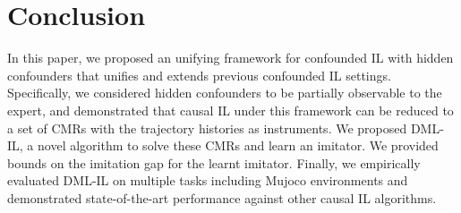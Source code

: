 \section{Conclusion}
In this paper, we proposed an unifying framework for confounded IL with hidden confounders that unifies and extends previous confounded IL settings. Specifically, we considered hidden confounders to be partially observable to the expert, and demonstrated that causal IL under this framework can be reduced to a set of CMRs with the trajectory histories as instruments. We proposed DML-IL, a novel algorithm to solve these CMRs and learn an imitator. We provided bounds on the imitation gap for the learnt imitator. Finally, we empirically evaluated DML-IL on multiple tasks including Mujoco environments and demonstrated state-of-the-art performance against other causal IL algorithms.